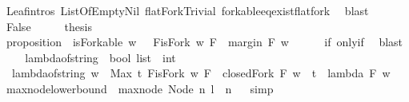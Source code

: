\begin{isabellebody}
\ Leaf{\isachardot}intros\ ListOfEmpty{\isachardot}Nil\ flatFork{\isacharunderscore}Trivial\ forkable{\isacharunderscore}eq{\isacharunderscore}exist{\isacharunderscore}flatfork\ \isamarkupfalse%
\ blast\ \isanewline
{}\isamarkupfalse%
\isanewline
\ \ \isamarkupfalse%
\ False\isanewline
\ \ \isamarkupfalse%
\ \isamarkupfalse%
\ {\isacharquery}thesis\ \isamarkupfalse%
\isanewline
{}\isamarkupfalse%
%
\endisatagproof
{\isafoldproof}%
%
\isadelimproof
\isanewline
%
\endisadelimproof
\ \ \isanewline
{}\isamarkupfalse%
\ proposition{\isacharunderscore}{}{\isacharunderscore}{}{}\ {\isacharcolon}\ {\isachardoublequoteopen}isForkable\ w\ {\isasymlongleftrightarrow}\ {\isacharparenleft}{\isasymexists}\ F{\isachardot}{\isacharparenleft}isFork\ w\ F\ {\isasymand}\ margin\ F\ w\ {\isasymge}\ {}{\isacharparenright}{\isacharparenright}{\isachardoublequoteclose}\isanewline
%
\isadelimproof
\ \ %
\endisadelimproof
%
\isatagproof
{}\isamarkupfalse%
\ if{\isacharunderscore}{}{\isacharunderscore}{}{}\ only{\isacharunderscore}if{\isacharunderscore}{}{\isacharunderscore}{}{}\ \isamarkupfalse%
\ blast%
\endisatagproof
{\isafoldproof}%
%
\isadelimproof
\ \isanewline
%
\endisadelimproof
\ \isanewline
{}\isamarkupfalse%
\ lambda{\isacharunderscore}of{\isacharunderscore}string\ {\isacharcolon}{\isacharcolon}\ {\isachardoublequoteopen}bool\ list\ {\isasymRightarrow}\ int{\isachardoublequoteclose}\ \ \ \ \isanewline
\ \ {\isachardoublequoteopen}lambda{\isacharunderscore}of{\isacharunderscore}string\ w\ {\isacharequal}\ Max\ {\isacharbraceleft}t{\isachardot}\ {\isacharparenleft}{\isasymexists}F{\isachardot}{\isacharparenleft}isFork\ w\ F\ {\isasymand}\ closedFork\ F\ w\ {\isasymand}\ t\ {\isacharequal}\ lambda\ F\ w{\isacharparenright}{\isacharparenright}{\isacharbraceright}{\isachardoublequoteclose}\isanewline
\isanewline
{}\isamarkupfalse%
\ max{\isacharunderscore}node{\isacharunderscore}lowerbound\ {\isacharcolon}\ {\isachardoublequoteopen}max{\isacharunderscore}node\ {\isacharparenleft}Node\ n\ l{\isacharparenright}\ {\isasymge}\ n{\isachardoublequoteclose}%
\isadelimproof
\ %
\endisadelimproof
%
\isatagproof
{}\isamarkupfalse%
\ simp%
\endisatagproof
{\isafoldproof}%
%
\isadelimproof
%
\endisadelimproof
\ \isanewline
\ \isanewline

\end{isabellebody}
